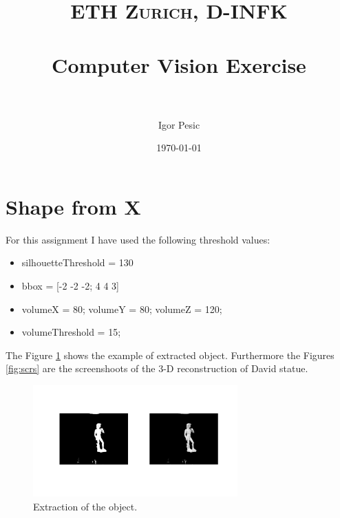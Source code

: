 \documentclass[paper=a4, fontsize=11pt]{scrartcl} %
\title{	
\normalfont \normalsize 
\textsc{ETH Zurich, D-INFK} \\ [25pt] %
\horrule{0.5pt} \\[0.4cm] %
\huge Computer Vision Exercise  \\ %
\horrule{2pt} \\[0.5cm] %
}
\author{Igor Pesic} %
\date{\normalsize\today} %
\numberwithin{equation}{section} %
\numberwithin{figure}{section} %
\numberwithin{table}{section} %
\begin{document}
\maketitle %


\section{Shape from X}

For this assignment I have used the following threshold values:
\begin{itemize}
\item silhouetteThreshold = 130
\item bbox = [-2 -2 -2; 4 4 3]
\item volumeX = 80; volumeY = 80; volumeZ = 120;
\item volumeThreshold = 15;
\end{itemize}

The Figure \ref{fig:extraction} shows the example of extracted object. Furthermore the Figures \ref{fig:scrs} are the screenshoots of the 3-D reconstruction of David statue.\\

\begin{figure}
\centering
\includegraphics[width=0.7\textwidth]{extraction.jpg}
\caption{Extraction of the object.}
\label{fig:extraction}
\end{figure}
\end{document}
